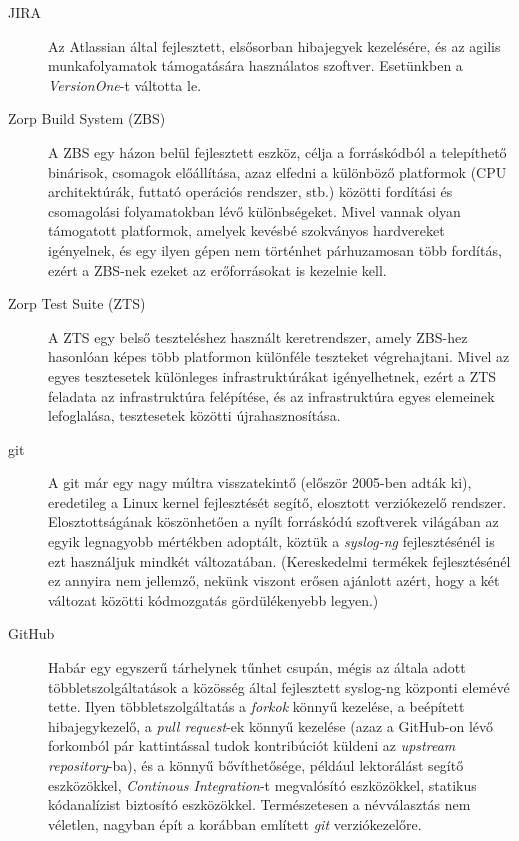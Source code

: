\begin{description}
    \item[JIRA] {Az Atlassian által fejlesztett, elsősorban hibajegyek kezelésére, és az agilis
        munkafolyamatok támogatására használatos szoftver. Esetünkben a \emph{VersionOne}-t váltotta
        le.}
    \item[Zorp Build System (ZBS)] {A ZBS egy házon belül fejlesztett eszköz, célja a forráskódból
        a telepíthető binárisok, csomagok előállítása, azaz elfedni a különböző platformok (CPU
        architektúrák, futtató operációs rendszer, stb.) közötti fordítási és csomagolási
        folyamatokban lévő különbségeket. Mivel vannak olyan támogatott platformok, amelyek
        kevésbé szokványos hardvereket igényelnek, és egy ilyen gépen nem történhet párhuzamosan
        több fordítás, ezért a ZBS-nek ezeket az erőforrásokat is kezelnie kell. }
    \item[Zorp Test Suite (ZTS)] { A ZTS egy belső teszteléshez használt keretrendszer, amely
        ZBS-hez hasonlóan képes több platformon különféle teszteket végrehajtani. Mivel az egyes
        tesztesetek különleges infrastruktúrákat igényelhetnek, ezért a ZTS feladata az
        infrastruktúra felépítése, és az infrastruktúra egyes elemeinek lefoglalása, tesztesetek
        közötti újrahasznosítása.}
    \item[git] {A git már egy nagy múltra visszatekintő (először 2005-ben adták ki), eredetileg a
        Linux kernel fejlesztését segítő, elosztott verziókezelő rendszer. Elosztottságának
        köszönhetően a nyílt forráskódú szoftverek világában az egyik legnagyobb mértékben
        adoptált, köztük a \emph{syslog-ng} fejlesztésénél is ezt használjuk mindkét változatában.
        (Kereskedelmi termékek fejlesztésénél ez annyira nem jellemző, nekünk viszont erősen
        ajánlott azért, hogy a két változat közötti kódmozgatás gördülékenyebb legyen.)}
    \item[GitHub] {Habár egy egyszerű tárhelynek tűnhet csupán, mégis az általa adott
        többletszolgáltatások a közösség által fejlesztett syslog-ng központi elemévé tette.
        Ilyen többletszolgáltatás a \emph{forkok} könnyű kezelése, a beépített hibajegykezelő,
        a \emph{pull request}-ek könnyű kezelése (azaz a GitHub-on lévő forkomból pár
        kattintással tudok kontribúciót küldeni az \emph{upstream repository}-ba), és a könnyű
        bővíthetősége, például lektorálást segítő eszközökkel, \emph{Continous Integration}-t
        megvalósító eszközökkel, statikus kódanalízist biztosító eszközökkel.
        Természetesen a névválasztás nem véletlen, nagyban épít a korábban említett \emph{git}
        verziókezelőre.}
\end{description}

